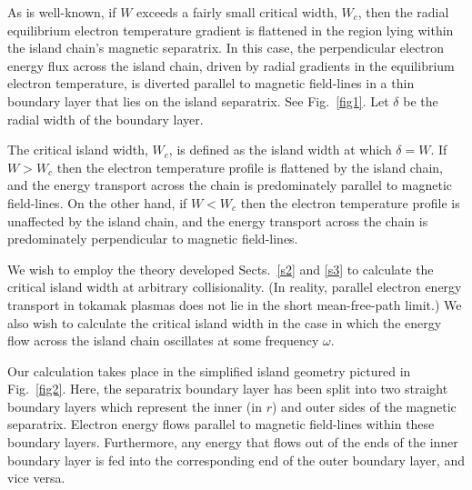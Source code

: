 \documentclass[12pt,prb,aps]{revtex4-1}
\begin{document}
As is well-known, if $W$ exceeds a fairly small critical width, $W_c$, then the radial equilibrium electron temperature
gradient is flattened in the region lying within the island chain's magnetic separatrix.\cite{rf} In this case, the perpendicular electron energy flux across the island chain, driven by radial gradients in the equilibrium electron temperature, is diverted   parallel to magnetic field-lines
in a thin boundary layer that lies on the island separatrix. See Fig.~\ref{fig1}. Let $\delta$ be the radial width of the boundary layer.

 The critical island width, $W_c$, is defined as the island width at which $\delta = W$. If
$W>W_c$ then the electron temperature profile is flattened by the island chain, and the energy transport across the chain is predominately parallel to magnetic field-lines. On the other hand,  if $W<W_c$ then the electron temperature profile is unaffected by the island chain, and the energy transport across the chain is predominately perpendicular to magnetic field-lines.\cite{rf} 

We wish to employ the theory developed Sects.~\ref{s2} and \ref{s3} to calculate the critical
island width at arbitrary collisionality. (In reality, parallel electron energy transport in tokamak plasmas does not lie in the short mean-free-path limit.) We also wish to calculate the critical island width in the case
in which the energy flow across the island chain oscillates at some frequency $\omega$. 

Our calculation takes place in the simplified island geometry pictured in Fig.~\ref{fig2}. Here, the separatrix boundary layer has been split into two straight boundary layers which represent the inner
(in $r$) and outer sides of the magnetic separatrix.  Electron energy flows parallel to magnetic field-lines within these boundary layers. Furthermore, any energy that flows out of the ends of the inner boundary layer is
fed into the corresponding end of the outer boundary layer, and vice versa. 
\end{document}
